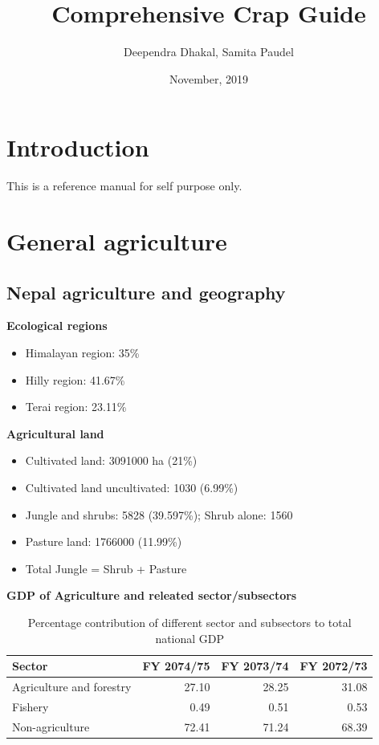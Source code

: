 \documentclass[
  openany]{book}
\title{Comprehensive Crap Guide}
\author{Deependra Dhakal, Samita Paudel}
\date{November, 2019}
\providecommand{\tightlist}{%
  \setlength{\itemsep}{0pt}\setlength{\parskip}{0pt}}
\begin{document}
\maketitle

{
\setcounter{tocdepth}{1}
\tableofcontents
}
\hypertarget{introduction}{%
\chapter{Introduction}\label{introduction}}

This is a reference manual for self purpose only.

\hypertarget{general-agriculture}{%
\chapter{General agriculture}\label{general-agriculture}}

\hypertarget{nepal-agriculture-and-geography}{%
\section{Nepal agriculture and geography}\label{nepal-agriculture-and-geography}}

\textbf{Ecological regions}

\begin{itemize}
\tightlist
\item
  Himalayan region: 35\%
\item
  Hilly region: 41.67\%
\item
  Terai region: 23.11\%
\end{itemize}

\textbf{Agricultural land}

\begin{itemize}
\tightlist
\item
  Cultivated land: 3091000 ha (21\%)
\item
  Cultivated land uncultivated: 1030 (6.99\%)
\item
  Jungle and shrubs: 5828 (39.597\%); Shrub alone: 1560
\item
  Pasture land: 1766000 (11.99\%)
\item
  Total Jungle = Shrub + Pasture
\end{itemize}

\textbf{GDP of Agriculture and releated sector/subsectors}

\begin{table}

\caption{\label{tab:unnamed-chunk-2}Percentage contribution of different sector and subsectors to total national GDP}
\centering
\begin{tabular}[t]{lrrr}
\toprule
Sector & FY 2074/75 & FY 2073/74 & FY 2072/73\\
\midrule
\rowcolor{gray!6}  Agriculture and forestry & 27.10 & 28.25 & 31.08\\
Fishery & 0.49 & 0.51 & 0.53\\
\rowcolor{gray!6}  Non-agriculture & 72.41 & 71.24 & 68.39\\
\bottomrule
\end{tabular}
\end{table}
\end{document}
